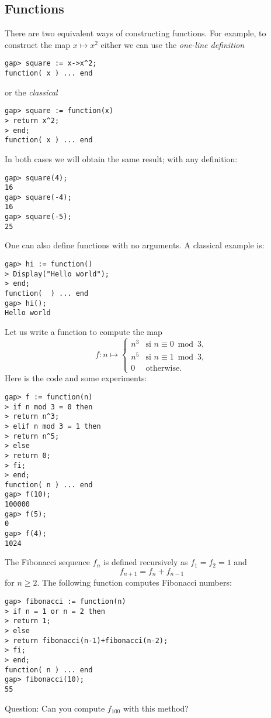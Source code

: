 \subsection*{Functions}

There are two equivalent ways of constructing functions. For example, to
construct the map $x\mapsto x^2$ either we can use the {\it one-line definition}
\begin{lstlisting}
gap> square := x->x^2;
function( x ) ... end
\end{lstlisting}
or the {\it classical}
\begin{lstlisting}
gap> square := function(x)
> return x^2;
> end;
function( x ) ... end
\end{lstlisting}
In both cases we will obtain the same result; with any definition:
\begin{lstlisting}
gap> square(4);
16
gap> square(-4);
16
gap> square(-5);
25
\end{lstlisting}
One can also define functions with no arguments. A classical example is:
\begin{lstlisting}
gap> hi := function()
> Display("Hello world");
> end;
function(  ) ... end
gap> hi();
Hello world
\end{lstlisting}

\begin{example}
Let us write a function to compute the map 
\[
f\colon n\mapsto\begin{cases}
	n^3 & \text{si $n\equiv0\bmod 3$},\\
	n^5 & \text{si $n\equiv1\bmod 3$},\\
	0 & \text{otherwise}.
\end{cases}
\]
Here is the code and some experiments:
\begin{lstlisting}
gap> f := function(n)
> if n mod 3 = 0 then
> return n^3;
> elif n mod 3 = 1 then
> return n^5;
> else
> return 0;
> fi;
> end;
function( n ) ... end
gap> f(10);
100000
gap> f(5);
0
gap> f(4);
1024
\end{lstlisting}
\end{example}

\begin{example}
\label{exa:Fibonacci:1}
The Fibonacci sequence $f_n$ is defined recursively as $f_1=f_2=1$ and 
\[
f_{n+1}=f_n+f_{n-1}
\]
for $n\geq2$. The following function computes Fibonacci numbers:
\begin{lstlisting}
gap> fibonacci := function(n)
> if n = 1 or n = 2 then
> return 1;
> else
> return fibonacci(n-1)+fibonacci(n-2);
> fi;
> end;
function( n ) ... end
gap> fibonacci(10);
55
\end{lstlisting}
Question: Can you compute $f_{100}$ with this method?
\end{example}

